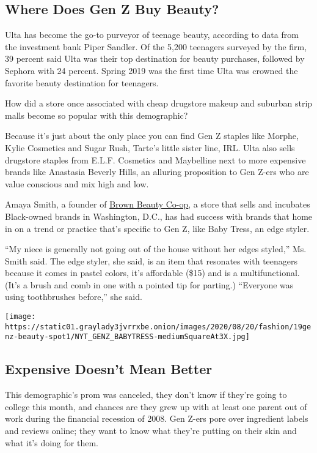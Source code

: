 \hypertarget{where-does-gen-z-buy-beauty}{%
\subsection{Where Does Gen Z Buy
Beauty?}\label{where-does-gen-z-buy-beauty}}

Ulta has become the go-to purveyor of teenage beauty, according to data
from the investment bank Piper Sandler. Of the 5,200 teenagers surveyed
by the firm, 39 percent said Ulta was their top destination for beauty
purchases, followed by Sephora with 24 percent. Spring 2019 was the
first time Ulta was crowned the favorite beauty destination for
teenagers.

How did a store once associated with cheap drugstore makeup and suburban
strip malls become so popular with this demographic?

Because it's just about the only place you can find Gen Z staples like
Morphe, Kylie Cosmetics and Sugar Rush, Tarte's little sister line, IRL.
Ulta also sells drugstore staples from E.L.F. Cosmetics and Maybelline
next to more expensive brands like Anastasia Beverly Hills, an alluring
proposition to Gen Z-ers who are value conscious and mix high and low.

Amaya Smith, a founder of \href{https://www.brownbeautyco-op.com/}{Brown
Beauty Co-op}, a store that sells and incubates Black-owned brands in
Washington, D.C., has had success with brands that home in on a trend or
practice that's specific to Gen Z, like Baby Tress, an edge styler.

``My niece is generally not going out of the house without her edges
styled,'' Ms. Smith said. The edge styler, she said, is an item that
resonates with teenagers because it comes in pastel colors, it's
affordable (\$15) and is a multifunctional. (It's a brush and comb in
one with a pointed tip for parting.) ``Everyone was using toothbrushes
before,'' she said.

\texttt{[image: https://static01.graylady3jvrrxbe.onion/images/2020/08/20/fashion/19genz-beauty-spot1/NYT\_GENZ\_BABYTRESS-mediumSquareAt3X.jpg]}

\hypertarget{expensive-doesnt-mean-better}{%
\subsection{Expensive Doesn't Mean
Better}\label{expensive-doesnt-mean-better}}

This demographic's prom was canceled, they don't know if they're going
to college this month, and chances are they grew up with at least one
parent out of work during the financial recession of 2008. Gen Z-ers
pore over ingredient labels and reviews online; they want to know what
they're putting on their skin and what it's doing for them.

